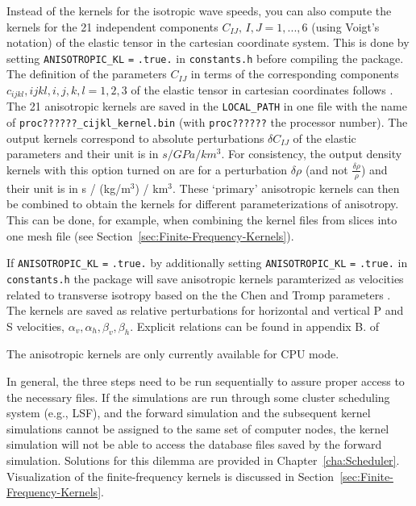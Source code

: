 \begin{enumerate}
Instead of the kernels for the isotropic wave speeds, you can also
compute the kernels for the 21 independent components $C_{IJ},\, I,J=1,...,6$
(using Voigt's notation) of the elastic tensor in the cartesian coordinate
system. This is done by setting \texttt{ANISOTROPIC\_KL} \texttt{=}
\texttt{.true.} in \texttt{constants.h} before compiling the package.
The definition of the parameters $C_{IJ}$ in terms of the corresponding
components $c_{ijkl},ijkl,i,j,k,l=1,2,3$ of the elastic tensor in
cartesian coordinates follows \citet{ChTr07}. The 21 anisotropic
kernels are saved in the \texttt{LOCAL\_PATH} in one file with the
name of \texttt{proc??????\_cijkl\_kernel.bin} (with \texttt{proc??????}
the processor number). The output kernels correspond to absolute perturbations
$\delta C_{IJ}$ of the elastic parameters and their unit is in $s/GPa/km^{3}$.
For consistency, the output density kernels with this option turned
on are for a perturbation $\delta\rho$ (and not $\frac{\delta\rho}{\rho}$)
and their unit is in s / (kg/m$^{3}$) / km$^{3}$. These `primary'
anisotropic kernels can then be combined to obtain the kernels for
different parameterizations of anisotropy. This can be done, for example,
when combining the kernel files from slices into one mesh file (see
Section~\ref{sec:Finite-Frequency-Kernels}).


If \texttt{ANISOTROPIC\_KL} \texttt{=} \texttt{.true.} by additionally
setting \texttt{ANISOTROPIC\_KL} \texttt{=} \texttt{.true.} in \texttt{constants.h}
the package will save anisotropic kernels paramterized as velocities
related to transverse isotropy based on the the Chen and Tromp parameters
\citet{ChTr07}. The kernels are saved as relative perturbations for
horizontal and vertical P and S velocities, $\alpha_{v},\alpha_{h},\beta_{v},\beta_{h}$.
Explicit relations can be found in appendix B. of \citet{SiLiTrTr07b}


The anisotropic kernels are only currently available for CPU mode.

\end{enumerate}
In general, the three steps need to be run sequentially to assure
proper access to the necessary files. If the simulations are run through
some cluster scheduling system (e.g., LSF), and the forward simulation
and the subsequent kernel simulations cannot be assigned to the same
set of computer nodes, the kernel simulation will not be able to access
the database files saved by the forward simulation. Solutions for
this dilemma are provided in Chapter~\ref{cha:Scheduler}. Visualization
of the finite-frequency kernels is discussed in Section~\ref{sec:Finite-Frequency-Kernels}.

